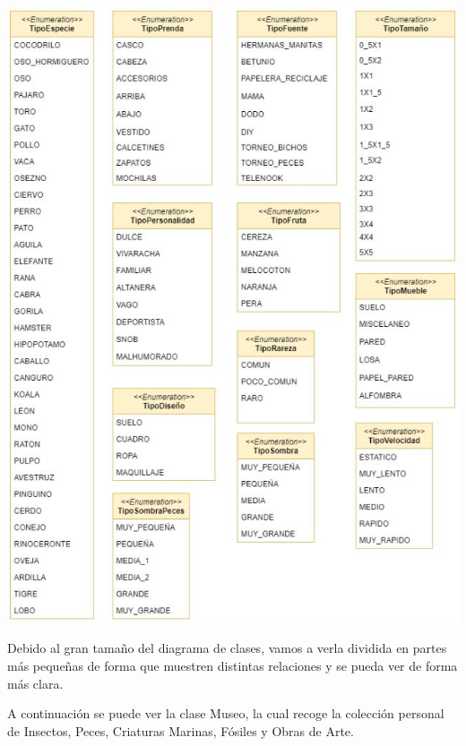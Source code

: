 	\includegraphics[width=\textwidth]{img/cap5/diagramaclases/enums.jpg}
	
	\bigskip
	
	Debido al gran tamaño del diagrama de clases, vamos a verla dividida en partes más pequeñas de forma que muestren distintas relaciones y se pueda ver de forma más clara.
	
	\bigskip
	
	A continuación se puede ver la clase Museo, la cual recoge la colección personal de Insectos, Peces, Criaturas Marinas, Fósiles y Obras de Arte.
	
	\bigskip
	
